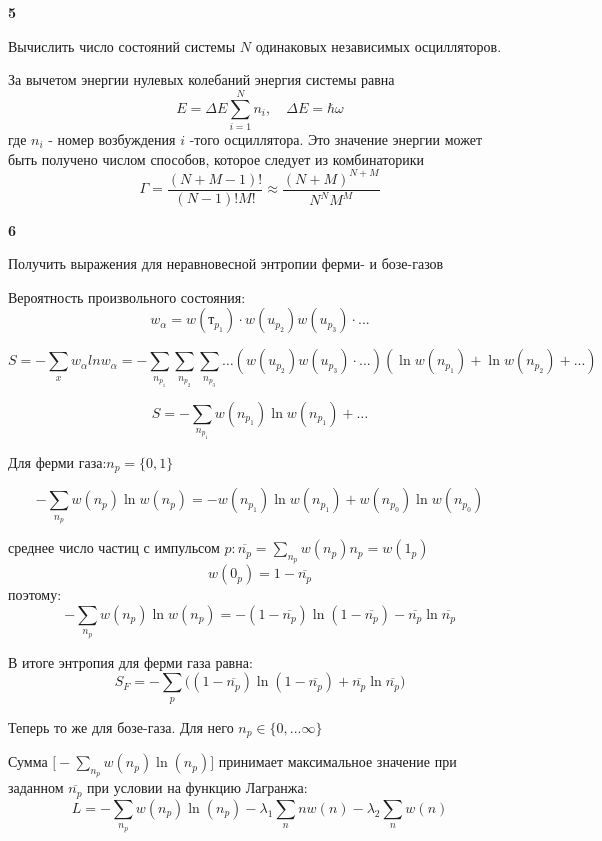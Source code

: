 \documentclass[a4paper,12pt]{article} %
\begin{document}
\begin{task}\textbf{5}

Вычислить число состояний системы $ N $ одинаковых независимых осцилляторов.


За вычетом энергии нулевых колебаний энергия системы равна
$$
E=\Delta E \sum_{i=1}^{N} n_{i}, \quad \Delta E=\hbar \omega
$$
где $n_{i}$ - номер возбуждения $i$ -того осциллятора. Это значение энергии может быть получено числом способов, которое следует из комбинаторики
$$
\Gamma=\frac{(N+M-1) !}{(N-1) ! M !} \approx \frac{(N+M)^{N+M}}{N^{N} M^{M}}
$$




\end{task}


\begin{task}\textbf{6}

Получить выражения для неравновесной энтропии ферми- и бозе-газов



Вероятность произвольного состояния:
$$
w_{\alpha}=w\left(т_{p_{1}}\right) \cdot w\left(u_{p_{2}}\right) w\left(u_{p_{3}}\right)\cdot ...
$$


$$
S=-\sum_{x} w_{\alpha} ln w_{\alpha}=-\sum_{n_{p_1}}\sum_{n_{p_2}}\sum_{n_{p_3}}\ldots 
(w\left(u_{p_{2}}\right) w\left(u_{p_{3}}\right)\cdot ...)
(\ln w(n_{p_1})+\ln w(n_{p_2})+... )
$$

\[ S=-\sum_{n_{p_1}}
w(n_{p_1}) \ln w(n_{p_1}) +\ldots \]



Для ферми газа:$ n_p=\{ 0, 1\} $

\[ -\sum_{n_p}w(n_{p}) \ln w(n_{p})=
-w(n_{p_1}) \ln w(n_{p_1})+
w(n_{p_0}) \ln w(n_{p_0})    \]


среднее число частиц с импульсом $ p: \overline{n_p}=\sum_{n_p}w(n_p) n_p =w (1_p)$
%
\[ w(0_p)=1-\overline{n_p} \]
%
поэтому:
\[ -\sum_{n_p}w(n_p)\ln w(n_p) = -(1-\overline{n_p})\ln (1-\overline{n_p}) - \overline{n_p} \ln \overline{n_p}\]


В итоге энтропия для ферми газа равна:
\[ S_F=-\sum_{p}\Big(
(1-\overline{n_p}) \ln (1-\overline{n_p})+\overline{n_p} \ln \overline{n_p}\Big) \]



Теперь то же для бозе-газа. Для него $ n_p\in \{0, ... \infty\} $


Сумма $ \Big[-\sum_{n_p} w(n_p) \ln (n_p)\Big]$ принимает максимальное значение при заданном $ \overline{n_p}$ при условии на функцию Лагранжа:
\[ L= -\sum_{n_p} w(n_p) \ln (n_p) -\lambda_1 \sum_n n w(n) - \lambda_2 \sum_n w(n)\]


\end{task}
\end{document}
